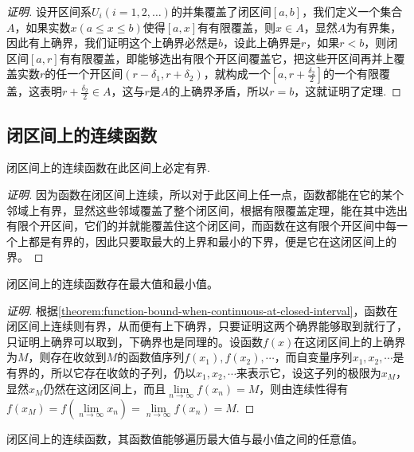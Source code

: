 \begin{proof}[证明]
  设开区间系$U_i(i=1,2,\ldots)$的并集覆盖了闭区间$[a,b]$，我们定义一个集合$A$，如果实数$x(a \leqslant x \leqslant b)$使得$[a,x]$有有限覆盖，则$x \in A$，显然$A$为有界集，因此有上确界，我们证明这个上确界必然是$b$，设此上确界是$r$，如果$r<b$，则闭区间$[a,r]$有有限覆盖，即能够选出有限个开区间覆盖它，把这些开区间再并上覆盖实数$r$的任一个开区间$(r-\delta_1,r+\delta_2)$，就构成一个$[a,r+\frac{\delta_2}{2}]$的一个有限覆盖，这表明$r+\frac{\delta_2}{2}\in A$，这与$r$是$A$的上确界矛盾，所以$r=b$，这就证明了定理.
\end{proof}

\subsection{闭区间上的连续函数}
\label{sec:continuous-function-in-closed-interval}

\begin{theorem}
  \label{theorem:function-bound-when-continuous-at-closed-interval}
  闭区间上的连续函数在此区间上必定有界.
\end{theorem}

\begin{proof}[证明]
  因为函数在闭区间上连续，所以对于此区间上任一点，函数都能在它的某个邻域上有界，显然这些邻域覆盖了整个闭区间，根据有限覆盖定理，能在其中选出有限个开区间，它们的并就能覆盖住这个闭区间，而函数在这有限个开区间中每一个上都是有界的，因此只要取最大的上界和最小的下界，便是它在这闭区间上的界。
\end{proof}

\begin{theorem}
  闭区间上的连续函数存在最大值和最小值。
\end{theorem}

\begin{proof}[证明]
  根据\autoref{theorem:function-bound-when-continuous-at-closed-interval}，函数在闭区间上连续则有界，从而便有上下确界，只要证明这两个确界能够取到就行了，只证明上确界可以取到，下确界也是同理的。设函数$f(x)$在这闭区间上的上确界为$M$，则存在收敛到$M$的函数值序列$f(x_1),f(x_2),\cdots$，而自变量序列$x_1,x_2,\cdots$是有界的，所以它存在收敛的子列，仍以$x_1,x_2,\cdots$来表示它，设这子列的极限为$x_M$，显然$x_M$仍然在这闭区间上，而且$\lim\limits_{n \to \infty}f(x_n)=M$，则由连续性得有$f(x_M)=f(\lim\limits_{n \to \infty} x_n) = \lim\limits_{n \to \infty} f(x_n) = M$.
\end{proof}

\begin{theorem}[介值定理]
  闭区间上的连续函数，其函数值能够遍历最大值与最小值之间的任意值。
\end{theorem}

